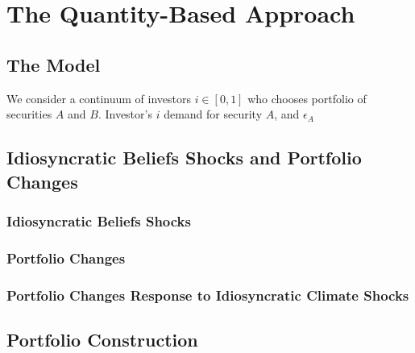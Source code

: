 \chapter{The Quantity-Based Approach}

\section{The Model}

We consider a continuum of investors $i \in [0,1]$ who chooses 
portfolio of securities $A$ and $B$. Investor's $i$ demand for 
security $A$, and $\epsilon_A$

\section{Idiosyncratic Beliefs Shocks and Portfolio Changes}

\subsection{Idiosyncratic Beliefs Shocks}

\subsection{Portfolio Changes}

\subsection{Portfolio Changes Response to Idiosyncratic Climate Shocks}

\section{Portfolio Construction}